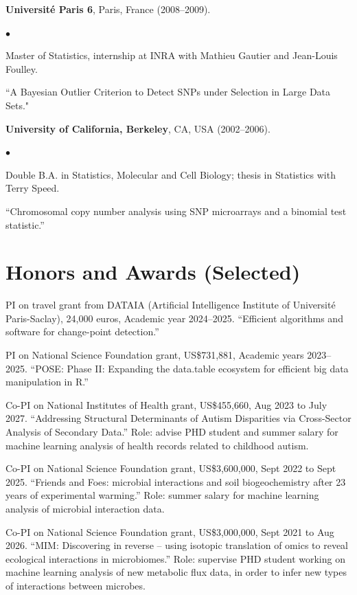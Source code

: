 \documentclass[margin,line]{res}
\newenvironment{list2}{
  \begin{list}{$\bullet$}{%
      \setlength{\itemsep}{0in}
      \setlength{\parsep}{0in} \setlength{\parskip}{0in}
      \setlength{\topsep}{0in} \setlength{\partopsep}{0in} 
      \setlength{\leftmargin}{0.2in}}}{\end{list}}
\begin{document}
\begin{resume}
{\bf Universit\'e Paris 6}, Paris, France (2008--2009).\\
\vspace*{-.1in}
\begin{list2}
\item[] Master of Statistics, internship at INRA with Mathieu Gautier and Jean-Louis Foulley.
\item[] ``A Bayesian Outlier Criterion to Detect SNPs under Selection in Large Data Sets."
\end{list2}

{\bf University of California, Berkeley}, CA, USA (2002--2006).\\
\vspace*{-.1in}
\begin{list2}
\item[] Double B.A. in Statistics, Molecular and Cell Biology; thesis in Statistics with Terry Speed.
\item[] ``Chromosomal copy number analysis using SNP microarrays and a binomial test statistic.'' 
\end{list2}

\section{\sc Honors and Awards (Selected)}

PI on travel grant from DATAIA (Artificial Intelligence Institute of
Université Paris-Saclay), 24,000 euros, Academic year
2024--2025. ``Efficient algorithms and software for change-point
detection.''

PI on National Science Foundation grant, US\$731,881, Academic years
2023--2025. ``POSE: Phase II: Expanding the data.table ecosystem for
efficient big data manipulation in R.''

Co-PI on National Institutes of Health grant, US\$455,660, Aug 2023 to
July 2027. ``Addressing Structural Determinants of Autism Disparities
via Cross-Sector Analysis of Secondary Data.'' Role: advise PHD
student and summer salary for machine learning analysis of health
records related to childhood autism.

Co-PI on National Science Foundation grant, US\$3,600,000, Sept 2022 to
Sept 2025. ``Friends and Foes: microbial interactions and soil
biogeochemistry after 23 years of experimental warming.'' Role: summer
salary for machine learning analysis of microbial interaction data.

Co-PI on National Science Foundation grant, US\$3,000,000, Sept 2021 to
Aug 2026. ``MIM: Discovering in reverse – using isotopic translation
of omics to reveal ecological interactions in microbiomes.'' Role:
supervise PHD student working on machine learning analysis of new
metabolic flux data, in order to infer new types of interactions
between microbes.


\end{resume}
\end{document}
